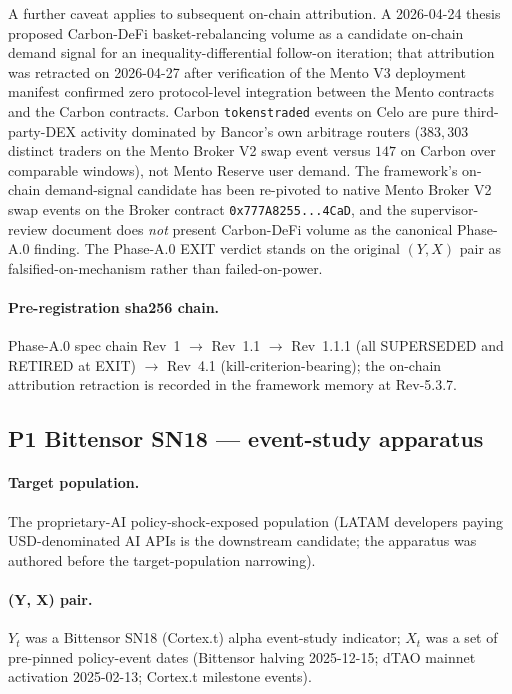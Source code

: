 A further caveat applies to subsequent on-chain attribution. A
2026-04-24 thesis proposed Carbon-DeFi basket-rebalancing volume as a
candidate on-chain demand signal for an inequality-differential
follow-on iteration; that attribution was retracted on 2026-04-27 after
verification of the Mento V3 deployment manifest confirmed zero
protocol-level integration between the Mento contracts and the Carbon
contracts. Carbon \texttt{tokenstraded} events on Celo are pure
third-party-DEX activity dominated by Bancor's own arbitrage routers
(\(383{,}303\) distinct traders on the Mento Broker V2 swap event versus
\(147\) on Carbon over comparable windows), not Mento Reserve user
demand. The framework's on-chain demand-signal candidate has been
re-pivoted to native Mento Broker V2 swap events on the Broker contract
\texttt{0x777A8255...4CaD}, and the supervisor-review document does
\emph{not} present Carbon-DeFi volume as the canonical Phase-A.0
finding. The Phase-A.0 EXIT verdict stands on the original
\((Y, X)\) pair as falsified-on-mechanism rather than failed-on-power.

\paragraph{Pre-registration sha256 chain.} Phase-A.0 spec chain
Rev~1 \(\to\) Rev~1.1 \(\to\) Rev~1.1.1 (all SUPERSEDED and RETIRED at
EXIT) \(\to\) Rev~4.1 (kill-criterion-bearing); the on-chain attribution
retraction is recorded in the framework memory at Rev-5.3.7.

\subsection{P1 Bittensor SN18 --- event-study apparatus}\label{sec:6.5}

\paragraph{Target population.} The proprietary-AI policy-shock-exposed
population (LATAM developers paying USD-denominated AI APIs is the
downstream candidate; the apparatus was authored before the
target-population narrowing).

\paragraph{(Y, X) pair.} \(Y_t\) was a Bittensor SN18 (Cortex.t) alpha
event-study indicator; \(X_t\) was a set of pre-pinned policy-event
dates (Bittensor halving 2025-12-15; dTAO mainnet activation 2025-02-13;
Cortex.t milestone events).

